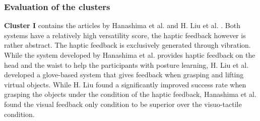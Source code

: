 \subsubsection{Evaluation of the clusters}

\textbf{Cluster I} contains the articles by Hanashima et al. and H. Liu et al. \cite{Hanashima2023, LiuH2019}. Both systems have a relatively high versatility score, the haptic feedback however is rather abstract. The haptic feedback is exclusively generated through vibration. While the system developed by Hanashima et al. provides haptic feedback on the head and the waist to help the participants with posture learning, H. Liu et al. developed a glove-based system that gives feedback when grasping and lifting virtual objects. While H. Liu found a significantly improved success rate when grasping the objects under the condition of the haptic feedback, Hanashima et al. found the visual feedback only condition to be superior over the visuo-tactile condition. 


